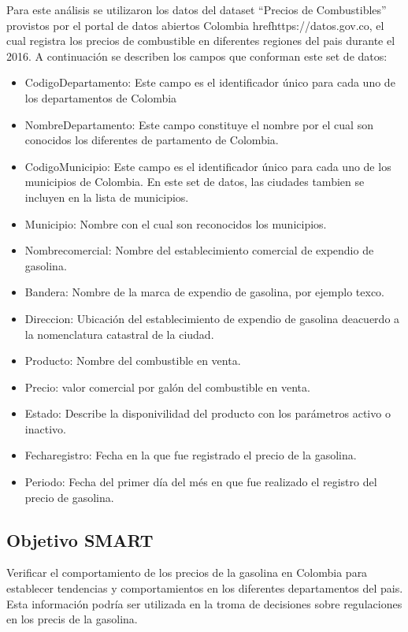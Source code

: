 Para este análisis se utilizaron los datos  del dataset “Precios de Combustibles” provistos por el portal de datos abiertos Colombia href{https://datos.gov.co}, el cual registra los precios de combustible en diferentes regiones del pais durante el 2016. A continuación se describen los campos que conforman este set de datos: 
 \begin{itemize}
  \item{CodigoDepartamento:} Este campo es el identificador único para cada uno de los departamentos de Colombia
  \item{NombreDepartamento:} Este campo constituye el nombre por el cual son conocidos los diferentes de partamento de Colombia. 
  \item{CodigoMunicipio:} Este campo es el identificador único para cada uno de los municipios de Colombia. En este set de datos, las ciudades tambien se incluyen en la lista de municipios. 
  \item{Municipio:} Nombre con el cual son reconocidos los municipios.	
  \item{Nombrecomercial:} Nombre del establecimiento comercial de expendio de gasolina. 
  \item{Bandera: } Nombre de la marca de expendio de gasolina, por ejemplo texco. 
  \item{Direccion:} Ubicación del establecimiento  de expendio de gasolina deacuerdo a la nomenclatura catastral de la ciudad. 
  \item{Producto:} Nombre del combustible en venta.
  \item{Precio:} valor comercial por galón del combustible en venta.
  \item{Estado:} Describe la disponivilidad del producto con los parámetros activo o inactivo.
  \item{Fecharegistro:} Fecha en la que fue registrado el precio de la gasolina.
  \item{Periodo:} Fecha del primer día del més en que fue realizado el registro del precio de gasolina.
 \end{itemize}
 \subsection{Objetivo SMART}
 Verificar el comportamiento de los precios de la gasolina en Colombia para establecer tendencias y comportamientos en los diferentes departamentos del pais.\\ Esta información podría ser utilizada en la troma de decisiones sobre regulaciones en los precis de la gasolina.
